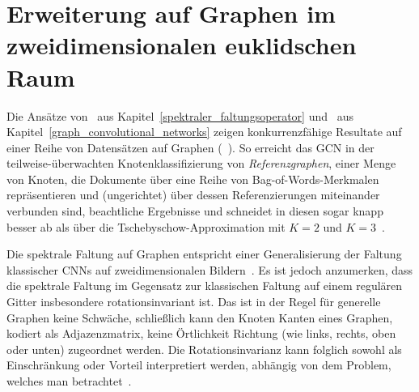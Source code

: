 \section{Erweiterung auf Graphen im zweidimensionalen euklidschen Raum}
\label{gcn_erweiterung}

Die Ansätze von~\citeauthor{Defferrard} aus Kapitel~\ref{spektraler_faltungsoperator} und~\citeauthor{gcn} aus Kapitel~\ref{graph_convolutional_networks} zeigen konkurrenzfähige Resultate auf einer Reihe von Datensätzen auf Graphen (\vgl{}~\cite{Defferrard, gcn}).
So erreicht das \gls{GCN} \zB{} in der teilweise-überwachten Knotenklassifizierung von \emph{Referenzgraphen}, \dhe{} einer Menge von Knoten, die Dokumente über eine Reihe von Bag-of-Words-Merkmalen repräsentieren und (ungerichtet) über dessen Referenzierungen miteinander verbunden sind, beachtliche Ergebnisse und schneidet in diesen sogar knapp besser ab als über die Tschebyschow-Approximation mit $K=2$ und $K=3$~\cite{gcn}.

Die spektrale Faltung auf Graphen entspricht einer Generalisierung der Faltung klassischer \glspl{CNN} auf zweidimensionalen Bildern~\cite{gcn_review}.
Es ist jedoch anzumerken, dass die spektrale Faltung im Gegensatz zur klassischen Faltung auf einem regulären Gitter insbesondere rotationsinvariant ist.
Das ist in der Regel für generelle Graphen keine Schwäche, schließlich kann den Knoten \bzw{} Kanten eines Graphen, kodiert als Adjazenzmatrix, keine Örtlichkeit \bzw{} Richtung (wie links, rechts, oben oder unten) zugeordnet werden.
Die Rotationsinvarianz kann folglich sowohl als Einschränkung oder Vorteil interpretiert werden, abhängig von dem Problem, welches man betrachtet~\cite{Defferrard}.



